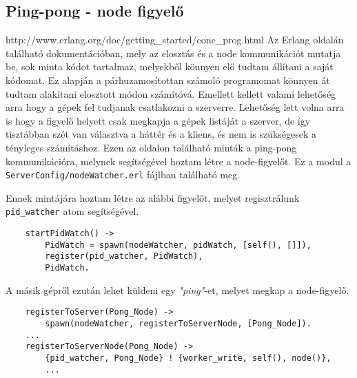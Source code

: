 \subsection{Ping-pong - node figyelő \label{subsec:nodewatcher}}
	http://www.erlang.org/doc/getting\_started/conc\_prog.html
	Az Erlang oldalán található dokumentációban, mely az elosztás és a node kommunikációt mutatja be, sok minta kódot tartalmaz, melyekből könnyen elő tudtam állítani a saját kódomat.\newline
	Ez alapján a párhuzamosítottan számoló programomat könnyen át tudtam alakítani elosztott módon számítóvá. \newline 
	Emellett kellett valami lehetőség arra hogy a gépek fel tudjanak csatlakozni a szerverre. Lehetőség lett volna arra is hogy a figyelő helyett csak megkapja a gépek listáját a szerver, de így tisztábban szét van választva a háttér és a kliens, és nem is szükségesek a tényleges számításhoz. \newline
	Ezen az oldalon található minták a ping-pong kommunikációra, melynek segítségével hoztam létre a node-figyelőt. Ez a modul a \texttt{ServerConfig/nodeWatcher.erl} fájlban található meg. \newline

	Ennek mintájára hoztam létre az alábbi figyelőt, melyet regisztrálunk \texttt{pid\_watcher} atom segítségével. 
	\begin{verbatim}
	startPidWatch() ->
	    PidWatch = spawn(nodeWatcher, pidWatch, [self(), []]),
	    register(pid_watcher, PidWatch),
	    PidWatch.
	\end{verbatim}

	A másik gépről ezután lehet küldeni egy \textit{"ping"}-et, melyet megkap a node-figyelő.
	\begin{verbatim}
	registerToServer(Pong_Node) ->
	    spawn(nodeWatcher, registerToServerNode, [Pong_Node]).
	...
	registerToServerNode(Pong_Node) -> 
	    {pid_watcher, Pong_Node} ! {worker_write, self(), node()},
	    ...
	\end{verbatim}


